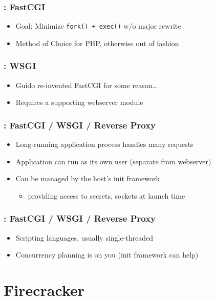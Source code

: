 \documentclass{beamer}
\begin{document}
\begin{frame}
	\frametitle{\insertsection : FastCGI}
	\begin{itemize}
		\pause \item Goal: Minimize \texttt{fork() + exec()} w/o major rewrite
		\pause \item Method of Choice for PHP, otherwise out of fashion
	\end{itemize}
\end{frame}

\begin{frame}
	\frametitle{\insertsection : WSGI}
	\begin{itemize}
		\pause \item Guido re-invented FastCGI for some reason\ldots
		\pause \item Requires a supporting webserver module
	\end{itemize}
\end{frame}

\begin{frame}
	\frametitle{\insertsection : FastCGI / WSGI / Reverse Proxy}
	\begin{itemize}
		\pause \item Long-running application process handles many requests
		\pause \item Application can run as its own user (separate from webserver)
		\pause \item Can be managed by the host's init framework
			\begin{itemize}
				\item providing access to secrets, sockets at launch time
			\end{itemize}
	\end{itemize}
\end{frame}

\begin{frame}
	\frametitle{\insertsection : FastCGI / WSGI / Reverse Proxy}
	\begin{itemize}
		\pause \item Scripting languages, usually single-threaded
		\pause \item Concurrency planning is on you (init framework can help)
	\end{itemize}
\end{frame}
 
\section{Firecracker}
\frame{\sectionpage}
\end{document}
